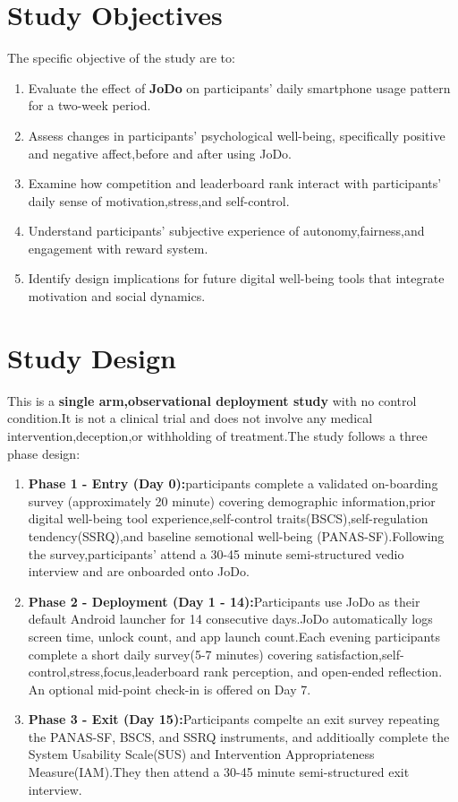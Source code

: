 \documentclass[12pt,a4paper]{article}
\begin{document}
\section{Study Objectives}
The specific objective of the study are to:
\begin{enumerate}
    \item Evaluate the effect of \textbf{JoDo} on participants' daily smartphone usage pattern for a two-week period.
    \item Assess changes in participants' psychological well-being, specifically positive and negative affect,before and after using JoDo.
    \item Examine how competition and leaderboard rank interact with participants' daily sense of motivation,stress,and self-control.
    \item Understand participants' subjective experience of autonomy,fairness,and engagement with reward system.
    \item Identify design implications for future digital well-being tools that integrate motivation and social dynamics.
\end{enumerate}
\section{Study Design}
This is a \textbf{single arm,observational deployment study} with no control condition.It is not a clinical trial and does not involve any medical intervention,deception,or withholding of treatment.The study follows a three phase design: 
\begin{enumerate}
    \item \textbf{Phase 1 - Entry (Day 0):}participants complete a validated on-boarding survey (approximately 20 minute) covering demographic information,prior digital well-being tool experience,self-control traits(BSCS),self-regulation tendency(SSRQ),and baseline semotional well-being (PANAS-SF).Following the survey,participants' attend a 30-45 minute semi-structured vedio interview and are onboarded onto JoDo.
    \item \textbf{Phase 2 - Deployment (Day 1 - 14):}Participants use JoDo as their default Android launcher for 14 consecutive days.JoDo automatically logs screen time, unlock count, and app launch count.Each evening participants complete a short daily survey(5-7 minutes) covering satisfaction,self-control,stress,focus,leaderboard rank perception, and open-ended reflection. An optional mid-point check-in is offered on Day 7.
    \item \textbf{Phase 3 - Exit (Day 15):}Participants compelte an exit survey repeating the PANAS-SF, BSCS, and SSRQ instruments, and additioally complete the System Usability Scale(SUS) and Intervention Appropriateness Measure(IAM).They then attend a 30-45 minute semi-structured exit interview.
\end{enumerate}
\end{document}
